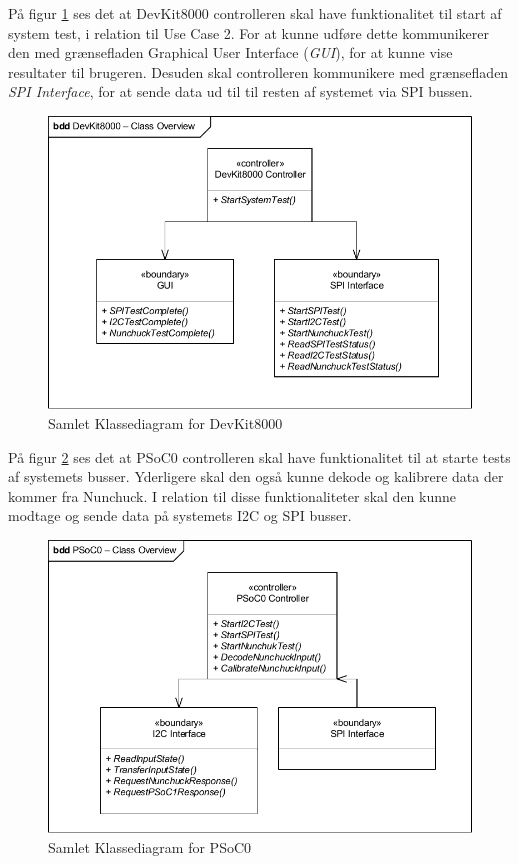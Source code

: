 På figur \ref{fig:CompleteClassDiagramDevKit8000} ses det at DevKit8000 controlleren skal have funktionalitet til start af system test, i relation til Use Case 2. For at kunne udføre dette kommunikerer den med grænsefladen Graphical User Interface (\textit{GUI}), for at kunne vise resultater til brugeren. Desuden skal controlleren kommunikere med grænsefladen \textit{SPI Interface}, for at sende data ud til til resten af systemet via SPI bussen.
\begin{figure}[H]
	\centering
	\includegraphics[width=\textwidth] {Systemarkitektur/images/CompleteClassDiagramDevKit8000}
	\caption{Samlet Klassediagram for DevKit8000}
	\label{fig:CompleteClassDiagramDevKit8000}
\end{figure}

På figur \ref{fig:CompleteClassDiagramPSoC0} ses det at PSoC0 controlleren skal have funktionalitet til at starte tests af systemets busser. Yderligere skal den også kunne dekode og kalibrere data der kommer fra Nunchuck. I relation til disse funktionaliteter skal den kunne modtage og sende data på systemets I2C og SPI busser.
\begin{figure}[H]
	\centering
	\includegraphics[width=\textwidth] {Systemarkitektur/images/CompleteClassDiagramPSoC0}
	\caption{Samlet Klassediagram for PSoC0}
	\label{fig:CompleteClassDiagramPSoC0}
\end{figure}

